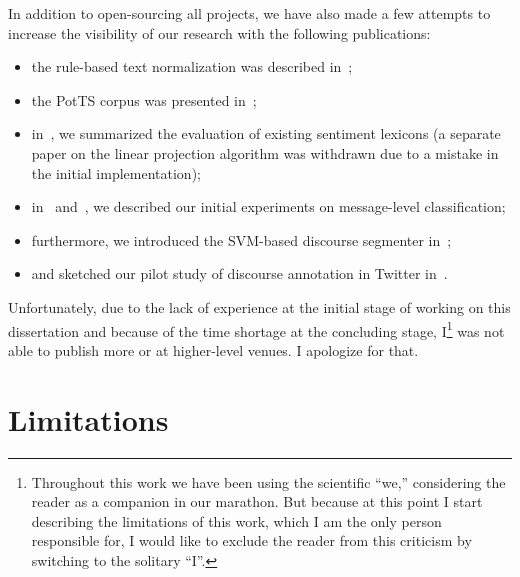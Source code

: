In addition to open-sourcing all projects, we have also made a few
attempts to increase the visibility of our research with the following
publications:
\begin{itemize}
  \item the rule-based text normalization was described
    in~\cite{Sidarenka:13};
  \item the PotTS corpus was presented in~\cite{Sidarenka:16};
  \item in~\cite{Sidarenka:16b}, we summarized the evaluation of
    existing sentiment lexicons (a separate paper on the linear
    projection algorithm was withdrawn due to a mistake in the initial
    implementation);
  \item in~\cite{Sidarenka:16a} and~\cite{Sidarenka:17}, we described
    our initial experiments on message-level classification;
  \item furthermore, we introduced the SVM-based discourse segmenter
    in~\cite{Sidarenka:15};
  \item and sketched our pilot study of discourse annotation in
    Twitter in~\cite{Sidarenka:15a}.
\end{itemize}
Unfortunately, due to the lack of experience at the initial stage of
working on this dissertation and because of the time shortage at the
concluding stage, I\footnote{Throughout this work we have been using
  the scientific ``we,'' considering the reader as a companion in our
  marathon.  But because at this point I start describing the
  limitations of this work, which I am the only person responsible
  for, I would like to exclude the reader from this criticism by
  switching to the solitary ``I''.} was not able to publish more or at
higher-level venues.  I apologize for that.


\section*{Limitations}

